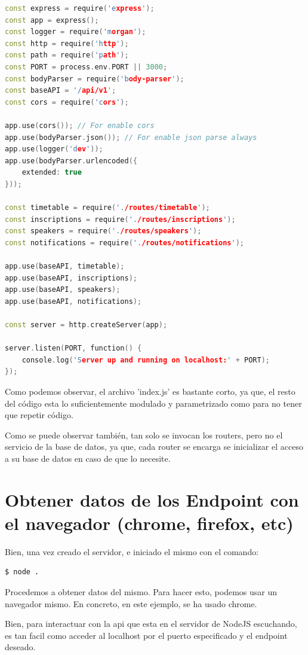 \documentclass{article}
\begin{document}
\begin{lstlisting}[language=C++]
const express = require('express');
const app = express();
const logger = require('morgan');
const http = require('http');
const path = require('path');
const PORT = process.env.PORT || 3000;
const bodyParser = require('body-parser');
const baseAPI = '/api/v1';
const cors = require('cors');

app.use(cors()); // For enable cors
app.use(bodyParser.json()); // For enable json parse always
app.use(logger('dev'));
app.use(bodyParser.urlencoded({
    extended: true
}));

const timetable = require('./routes/timetable');
const inscriptions = require('./routes/inscriptions');
const speakers = require('./routes/speakers');
const notifications = require('./routes/notifications');

app.use(baseAPI, timetable);
app.use(baseAPI, inscriptions);
app.use(baseAPI, speakers);
app.use(baseAPI, notifications);

const server = http.createServer(app);

server.listen(PORT, function() {
    console.log('Server up and running on localhost:' + PORT);
});
\end{lstlisting}

Como podemos observar, el archivo 'index.js' es bastante corto, ya que, el resto del código esta lo suficientemente modulado y parametrizado como para no tener que repetir código.

Como se puede observar también, tan solo se invocan los routers, pero no el servicio de la base de datos, ya que, cada router se encarga se inicializar el acceso a su base de datos en caso de que lo necesite.

\section{Obtener datos de los Endpoint con el navegador (chrome, firefox, etc)}
Bien, una vez creado el servidor, e iniciado el mismo con el comando:

\begin{lstlisting}[language=bash]
    $ node .
\end{lstlisting}

Procedemos a obtener datos del mismo. Para hacer esto, podemos usar un navegador mismo. En concreto, en este ejemplo, se ha usado chrome.

Bien, para interactuar con la api que esta en el servidor de NodeJS escuchando, es tan facil como acceder al localhost por el puerto especificado y el endpoint deseado.
\end{document}
